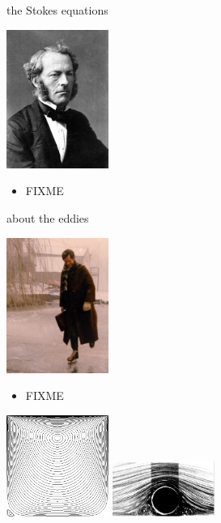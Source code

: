 \documentclass[10pt,hyperref,dvipsnames]{beamer}
\begin{document}
\begin{frame}{the Stokes equations}

\hfill \includegraphics[width=0.25\textwidth]{figs/people/gstokes.jpg}

\vspace{-20mm}
\begin{itemize}
\item FIXME
\end{itemize}
\end{frame}


\begin{frame}{about the eddies}

\hfill \includegraphics[width=0.25\textwidth]{figs/people/hkmoffatt.png}

\begin{itemize}
\item FIXME
\end{itemize}

\hfill \includegraphics[width=0.25\textwidth]{figs/eddies1.png} \includegraphics[width=0.25\textwidth]{figs/cylindereddies.pdf}
\end{frame}
\end{document}

